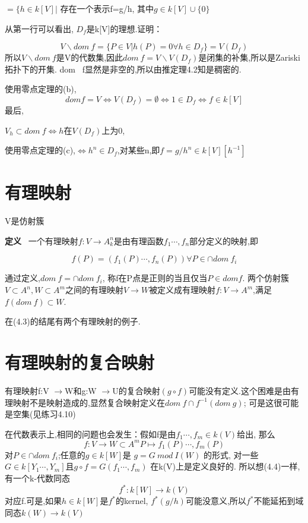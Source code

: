 \documentclass[UTF8]{book}
\begin{document}
			  $ =\{ h\in k[V] \vert$ 存在一个表示f=g/h, 其中$g\in k[V]\cup \{0\}$

		\justifying

		从第一行可以看出, $D_{f}$是k[V]的理想.证明：

		\begin{equation*}
		V\backslash dom \ f=\{P\in V \vert h(P)= 0 \forall h\in D_{f}\}=V(D_{f})
		\end{equation*}
		所以$V\backslash dom \ f$是V的代数集,因此$dom \ f=V\backslash V(D_{f})$是闭集的补集,所以是Zariski拓扑下的开集. dom \ f显然是非空的,所以由推定理4.2知是稠密的.

		使用零点定理的(b),
		\begin{equation*}
		dom f=V\iff V(D_{f})=\emptyset \iff 1\in D_{f} \iff f\in k[V]
		\end{equation*}
		最后,

		$V_{h}\subset dom \ f \iff h $在$V(D_{f})$上为0,

		使用零点定理的(c),$\iff h^{n}\in D_{f}$,对某些n,即$f=g/h^{n}\in k[V][h^{-1}]$

	\section{有理映射}V是仿射簇

		\textbf{定义} \ 一个有理映射$f:V\rightarrow A^{n}_{k}$是由有理函数$f_{1}\cdots ,f_{n}$部分定义的映射,即

		\begin{equation*}
		f(P)=(f_{1}(P)\cdots, f_{n}(P)) \forall P\in \cap dom \ f_{i}
		\end{equation*}

		通过定义,$dom \ f=\cap dom \ f_{i}$, 称f在P点是正则的当且仅当$P\in dom f$. 两个仿射簇$V\subset A^{n},W\subset A^{m}$之间的有理映射$V\rightarrow W$被定义成有理映射$f:V\rightarrow A^{m}$,满足$f(dom \ f)\subset W.$

		在(4.3)的结尾有两个有理映射的例子.

	\section{有理映射的复合映射}
		有理映射f:V $\rightarrow $W和g:W $\rightarrow $U的复合映射$(g\circ f)$可能没有定义.这个困难是由有理映射不是映射造成的,显然复合映射定义在$dom \ f\cap f^{-1}(dom \ g)$; 可是这很可能是空集(见练习4.10)

		在代数表示上,相同的问题也会发生：假如f是由$f_{1}\cdots ,f_{m}\in k(V)$给出, 那么
		\begin{equation*}
		f:V \rightarrow W\subset A^{m}
		P \mapsto f_{1}(P)\cdots, f_{m}(P)
		\end{equation*}
		对$P\in \cap dom \ f_{i}$;任意的$g\in k[W]$是 $g=G \ mod \ I(W)$ 的形式, 对一些$G\in k[Y_{1}\cdots,Y_{m}]$且$g\circ f=G(f_{1}\cdots ,f_{m})$ 在k(V)上是定义良好的. 所以想(4.4)一样,有一个k-代数同态
		\begin{equation*}
		f^{*}:k[W]\rightarrow k(V)
		\end{equation*}
		对应f.可是,如果$h\in k[W]$是$f^{*}$的kernel, $f^{*}(g/h)$可能没意义,所以$f^{*}$不能延拓到域同态$k(W)\rightarrow k(V)$
\end{document}
